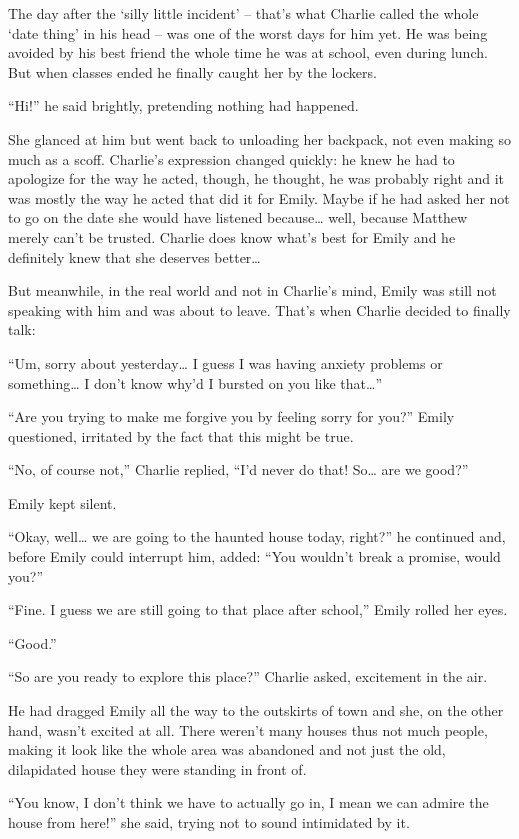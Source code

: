The day after the ‘silly little incident’ – that’s what Charlie called the whole ‘date thing’ in his head – was one of the worst days for him yet. He was being avoided by his best friend the whole time he was at school, even during lunch. But when classes ended he finally caught her by the lockers.

“Hi!” he said brightly, pretending nothing had happened.

She glanced at him but went back to unloading her backpack, not even making so much as a scoff. Charlie’s expression changed quickly: he knew he had to apologize for the way he acted, though, he thought, he was probably right and it was mostly the way he acted that did it for Emily. Maybe if he had asked her not to go on the date she would have listened because… well, because Matthew merely can’t be trusted. Charlie does know what’s best for Emily and he definitely knew that she deserves better…

But meanwhile, in the real world and not in Charlie’s mind, Emily was still not speaking with him and was about to leave. That’s when Charlie decided to finally talk:

“Um, sorry about yesterday… I guess I was having anxiety problems or something… I don’t know why’d I bursted on you like that…”

“Are you trying to make me forgive you by feeling sorry for you?” Emily questioned, irritated by the fact that this might be true.

“No, of course not,” Charlie replied, “I’d never do that! So… are we good?”

Emily kept silent.

“Okay, well… we are going to the haunted house today, right?” he continued and, before Emily could interrupt him, added: “You wouldn’t break a promise, would you?”

“Fine. I guess we are still going to that place after school,” Emily rolled her eyes.

“Good.”

\bigskip

“So are you ready to explore this place?” Charlie asked, excitement in the air.

He had dragged Emily all the way to the outskirts of town and she, on the other hand, wasn’t excited at all. There weren’t many houses thus not much people, making it look like the whole area was abandoned and not just the old, dilapidated house they were standing in front of.

“You know, I don’t think we have to actually go in, I mean we can admire the house from here!” she said, trying not to sound intimidated by it.

